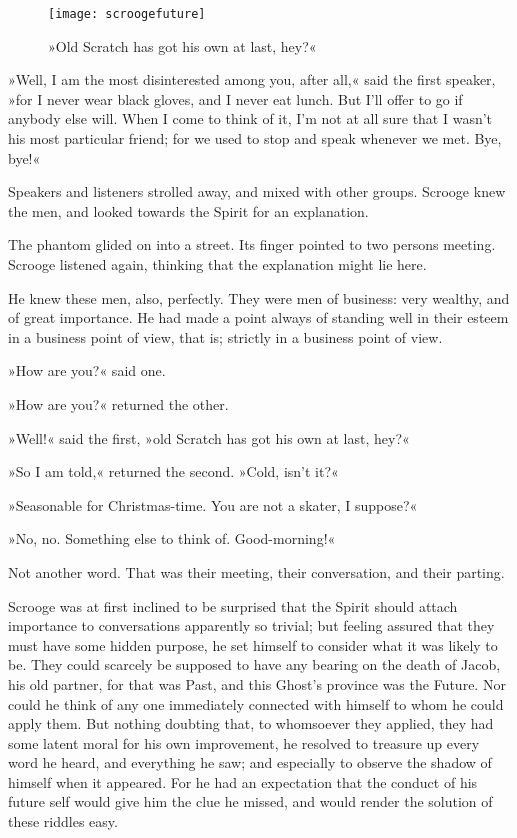 \begin{figure}[p]
\centering
\texttt{[image: scroogefuture]}
\caption[\textbf{»Old Scratch has got his own at last, hey?«}]{»Old Scratch has got his own at last, hey?«}
\end{figure}

»Well, I am the most disinterested among you, after all,« said the first speaker, »for I never wear black gloves, and I never eat lunch. But I'll offer to go if anybody else will. When I come to think of it, I'm not at all sure that I wasn't his most particular friend; for we used to stop and speak whenever we met. Bye, bye!«

Speakers and listeners strolled away, and mixed with other groups. Scrooge knew the men, and looked towards the Spirit for an explanation.

The phantom glided on into a street. Its finger pointed to two persons meeting. Scrooge listened again, thinking that the explanation might lie here.

He knew these men, also, perfectly. They were men of business: very wealthy, and of great importance. He had made a point always of standing well in their esteem in a business point of view, that is; strictly in a business point of view.

»How are you?« said one.

»How are you?« returned the other.

»Well!« said the first, »old Scratch has got his own at last, hey?«

»So I am told,« returned the second. »Cold, isn't it?«

»Seasonable for Christmas-time. You are not a skater, I suppose?«

»No, no. Something else to think of. Good-morning!«

Not another word. That was their meeting, their conversation, and their parting.

Scrooge was at first inclined to be surprised that the Spirit should attach importance to conversations apparently so trivial; but feeling assured that they must have some hidden purpose, he set himself to consider what it was likely to be. They could scarcely be supposed to have any bearing on the death of Jacob, his old partner, for that was Past, and this Ghost's province was the Future. Nor could he think of any one immediately connected with himself to whom he could apply them. But nothing doubting that, to whomsoever they applied, they had some latent moral for his own improvement, he resolved to treasure up every word he heard, and everything he saw; and especially to observe the shadow of himself when it appeared. For he had an expectation that the conduct of his future self would give him the clue he missed, and would render the solution of these riddles easy.

